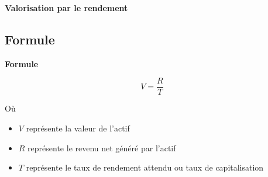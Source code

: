 \documentclass{beamer}
\begin{document}
\begin{frame}{\textbf{Valorisation par le rendement}}
\subsection{Formule}
\begin{alertblock}{\textbf{Formule}}

\[ V = \frac{R}{T} \]

Où

\begin{itemize}
	\item \( V \) représente la valeur de l'actif
	\item \( R \) représente le revenu net généré par l’actif
	\item \( T \) représente le taux de rendement attendu ou taux de capitalisation
\end{itemize}

\end{alertblock}

\end{frame}
	
\end{document}
